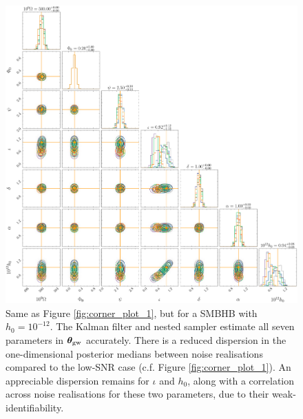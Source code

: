 \documentclass[fleqn,usenatbib,useAMS]{mnras}
\begin{document}
\begin{figure}
	\includegraphics[width=\textwidth, height = \textwidth ]{images/corner_highSNR} 	
	\caption{Same as Figure \ref{fig:corner_plot_1}, but for a SMBHB with $h_0 = 10^{-12}$. The Kalman filter and nested sampler estimate all seven parameters in $\boldsymbol{\theta}_{\rm gw}$ accurately. There is a reduced dispersion in the  one-dimensional posterior medians between noise realisations compared to the low-SNR case (c.f. Figure \ref{fig:corner_plot_1}). An appreciable dispersion remains for $\iota$ and $h_0$, along with a correlation across noise realisations for these two parameters, due to their weak-identifiability.}
	\label{fig:corner_high_snr_appendix}
\end{figure}
\end{document}

